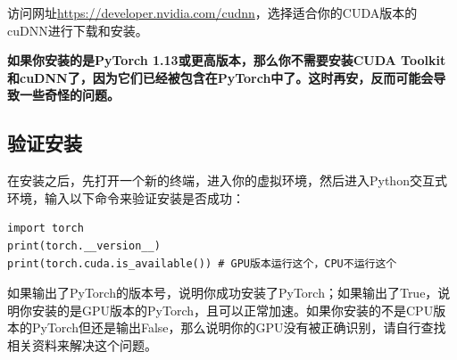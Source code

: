 \documentclass[12pt]{ctexart}
\begin{document}
访问网址\url{https://developer.nvidia.com/cudnn}，选择适合你的CUDA版本的cuDNN进行下载和安装。

\textbf{如果你安装的是PyTorch 1.13或更高版本，那么你不需要安装CUDA Toolkit和cuDNN了，因为它们已经被包含在PyTorch中了。这时再安，反而可能会导致一些奇怪的问题。}

\subsection{验证安装}

在安装之后，先打开一个新的终端，进入你的虚拟环境，然后进入Python交互式环境，输入以下命令来验证安装是否成功：
\begin{verbatim}
import torch
print(torch.__version__)
print(torch.cuda.is_available()) # GPU版本运行这个，CPU不运行这个
\end{verbatim}
如果输出了PyTorch的版本号，说明你成功安装了PyTorch；如果输出了True，说明你安装的是GPU版本的PyTorch，且可以正常加速。如果你安装的不是CPU版本的PyTorch但还是输出False，那么说明你的GPU没有被正确识别，请自行查找相关资料来解决这个问题。
\end{document}
